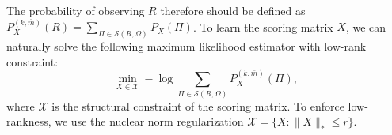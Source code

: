 \documentclass{article}
\begin{document}



The probability of observing $R$ therefore should be defined as
    $P_{X}^{(k, \bar{m})}(R) =  \sum_{\Pi \in \mathcal S (R, \Omega)}P_X(\Pi)$. 
To learn the scoring matrix $X$, we can naturally solve the following maximum likelihood estimator with low-rank constraint: 
\begin{equation}
   \min_{X \in \mathcal X} - \log  \sum_{\Pi \in \mathcal S (R, \Omega)} P_X^{(k, \bar{m})}(\Pi), 
    \label{eq:aaa}
\end{equation}
 where $\mathcal{X}$ is the structural constraint of the scoring matrix. 
 To enforce low-rankness, we use the nuclear norm regularization $\mathcal{X}=\{X: \|X\|_*\leq r\}$. 
\end{document}
